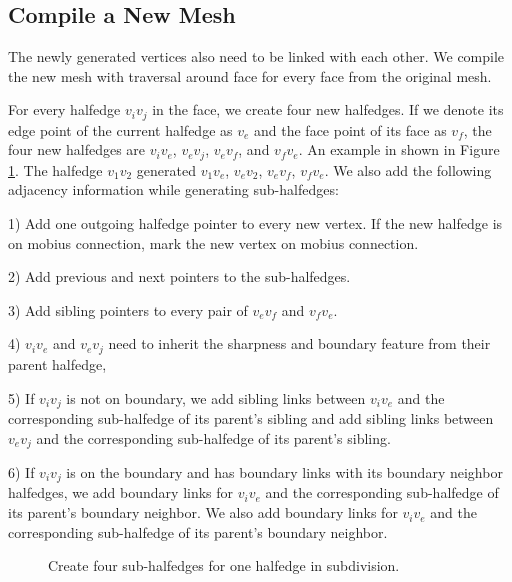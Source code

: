 \documentclass[12pt]{article}
\begin{document}
\subsection{Compile a New Mesh}
The newly generated vertices also need to be linked with each other. We compile the new mesh with traversal around face for every face from the original mesh.

For every halfedge $v_iv_j$ in the face, we create four new halfedges. If we denote its edge point of the current halfedge as $v_e$ and the face point of its face as $v_f$, the four new halfedges are $v_iv_e$, $v_ev_j$, $v_ev_f$, and $v_fv_e$. An example in shown in Figure \ref{figure:compileNewMesh}. The halfedge $v_1v_2$ generated $v_1v_e$, $v_ev_2$, $v_ev_f$, $v_fv_e$. We also add the following adjacency information while generating sub-halfedges: 

1) Add one outgoing halfedge pointer to every new vertex. If the new halfedge is on mobius connection, mark the new vertex on mobius connection.

2) Add previous and next pointers to the sub-halfedges. 

3) Add sibling pointers to every pair of $v_ev_f$ and $v_fv_e$.

4) $v_iv_e$ and $v_ev_j$ need to inherit the sharpness and boundary feature from their parent halfedge, 

5) If $v_iv_j$ is not on boundary, we add sibling links between $v_iv_e$ and the corresponding sub-halfedge of its parent's sibling and add sibling links between $v_ev_j$ and the corresponding sub-halfedge of its parent's sibling.

6) If $v_iv_j$ is on the boundary and has boundary links with its boundary neighbor halfedges, we add boundary links for $v_iv_e$ and the corresponding sub-halfedge of its parent's boundary neighbor. We also add boundary links for $v_iv_e$ and the corresponding sub-halfedge of its parent's boundary neighbor.

\begin{figure}[ht]
  \centering
  \caption{Create four sub-halfedges for one halfedge in subdivision.}
  \label{figure:compileNewMesh}
\end{figure}
\end{document}
